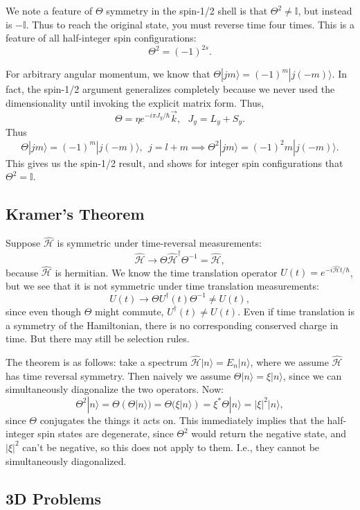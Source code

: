 \documentclass[fontsize=12pt]{scrartcl}
\newcommand{\bb}[1]{\mathbb{#1}}
\newcommand{\Id}{\bb{I}}
\newcommand{\ra}{\rangle}
\newcommand{\Ham}{\hat{\mathcal{H}}}
\begin{document}
We note a feature of $\Theta$ symmetry in the spin-1/2 shell is that $\Theta^2\neq \Id$, but instead is $-\Id$. Thus to reach the original state, you must reverse time four times. This is a feature of all half-integer spin configurations: $$\Theta^2=(-1)^{2s}.$$

For arbitrary angular momentum, we know that $\Theta|jm\ra = (-1)^m |j (-m)\ra.$ In fact, the spin-1/2 argument generalizes completely because we never used the dimensionality until invoking the explicit matrix form. Thus, $$\Theta = \eta e^{-i\pi J_y/\hbar}\vec{k}, \ \ \ J_y=L_y+S_y.$$ Thus $$\Theta|jm\ra = (-1)^m |j(-m)\ra, \ \ j=l+m \implies \Theta^2|jm\ra = (-1)^2m|j(-m)\ra.$$ This gives us the spin-1/2 result, and shows for integer spin configurations that $\Theta^2=\Id$.

\subsection{Kramer's Theorem}

Suppose $\Ham$ is symmetric under time-reversal measurements: $$\Ham\to \Theta\Ham^\dagger\Theta^{-1}=\Ham,$$ because $\Ham$ is hermitian. We know the time translation operator $U(t)=e^{-i\Ham t/\hbar}$, but we see that it is not symmetric under time translation measurements: $$U(t)\to \Theta U^\dagger(t) \Theta^{-1}\neq U(t),$$ since even though $\Theta$ might commute, $U^\dagger(t)\neq U(t)$. Even if time translation is a symmetry of the Hamiltonian, there is no corresponding conserved charge in time. But there may still be selection rules.

The theorem is as follows: take a spectrum $\Ham|n\ra = E_n|n\ra$, where we assume $\Ham$ has time reversal symmetry. Then naively we assume $\Theta|n\ra = \xi |n\ra$, since we can simultaneously diagonalize the two operators. Now: $$\Theta^2|n\ra = \Theta(\Theta|n\ra)=\Theta(\xi|n\ra)=\xi^*\Theta|n\ra = |\xi|^2|n\ra,$$ since $\Theta$ conjugates the things it acts on. This immediately implies that the half-integer spin states are degenerate, since $\Theta^2$ would return the negative state, and $|\xi|^2$ can't be negative, so this does not apply to them. I.e., they cannot be simultaneously diagonalized.

\subsection{3D Problems}
\end{document}
